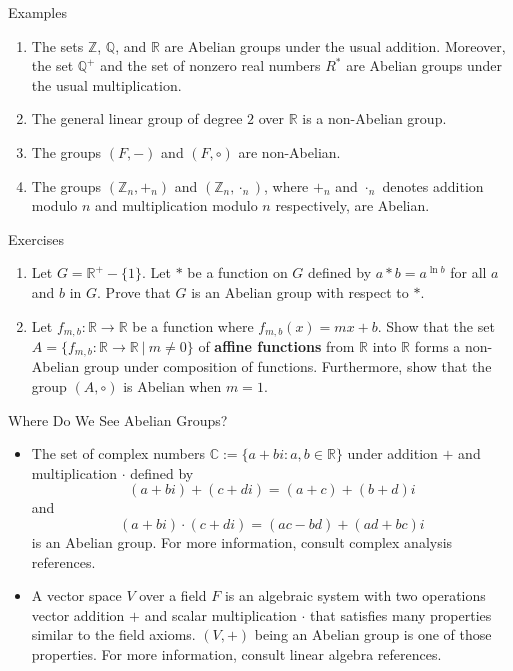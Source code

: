\documentclass{beamer}
\begin{document}
\begin{frame}{Examples}
\begin{enumerate}
\justifying
\item The sets $\mathbb{Z}$, $\mathbb{Q}$, and $\mathbb{R}$ are Abelian groups under the usual addition. Moreover, the set $\mathbb{Q}^+$ and the set of nonzero real numbers $R^{*}$ are Abelian groups under the usual multiplication.
\pause
\item The general linear group of degree $2$ over $\mathbb{R}$ is a non-Abelian group.
\pause
\item The groups $(F, -)$ and $(F, \circ)$ are non-Abelian.  
\pause
\item The groups $\left(\mathbb{Z}_n, +_n\right)$ and $\left(\mathbb{Z}_n, \cdot_n\right)$, where $+_n$ and $\cdot_n$ denotes addition modulo $n$ and multiplication modulo $n$ respectively, are Abelian.
\end{enumerate}    
\end{frame}

\begin{frame}{Exercises}
\begin{enumerate}
\justifying
\item Let $G = \mathbb{R}^+ - \{1\}$. Let $*$ be a function on $G$ defined by $a * b = a^{\ln b}$ for all $a$ and $b$ in $G$. Prove that $G$ is an Abelian group with respect to $*$.
\item Let $f_{m, b} : \mathbb{R} \rightarrow \mathbb{R}$ be a function where $f_{m, b}(x) = mx + b$. Show that the set $A = \{f_{m, b} : \mathbb{R} \rightarrow \mathbb{R} \ | \ m \neq 0\}$ of \textbf{affine functions} from $\mathbb{R}$ into $\mathbb{R}$ forms a non-Abelian group under composition of functions. Furthermore, show that the group $(A, \circ)$ is Abelian when $m = 1$.
\end{enumerate}
\end{frame}

\begin{frame}{Where Do We See Abelian Groups?}
\begin{itemize}
\justifying
\item The set of complex numbers $\mathbb{C} := \{a + bi : a, b \in \mathbb{R}\}$ under addition $+$ and multiplication $\cdot$ defined by
\[
(a + bi) + (c + di) = (a + c) + (b + d)i
\]
and
\[
(a + bi) \cdot (c + di) = (ac - bd) + (ad + bc)i
\]
is an Abelian group. For more information, consult complex analysis references.
\item A vector space $V$ over a field $F$ is an algebraic system with two operations vector addition $+$ and scalar multiplication $\cdot$ that satisfies many properties similar to the field axioms. $(V, +)$ being an Abelian group is one of those properties. For more information, consult linear algebra references.
\end{itemize}
\end{frame}
\end{document}
